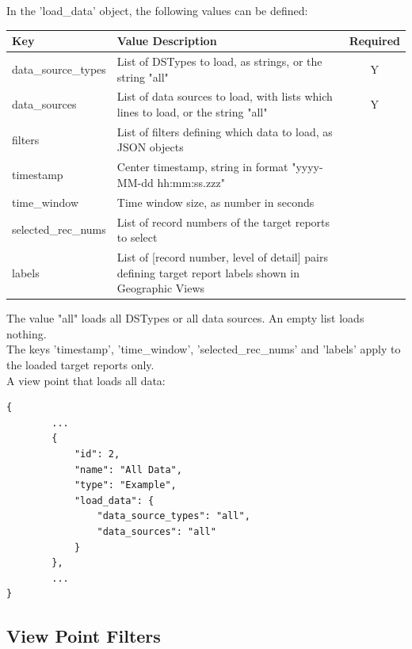 In the 'load\_data' object, the following values can be defined:

\begin{center}
 \begin{table}[H]
  \begin{tabularx}{\textwidth}{ | l | X | c | }
    \hline
    \textbf{Key} & \textbf{Value Description} & \textbf{Required} \\ \hline
    data\_source\_types & List of DSTypes to load, as strings, or the string "all" & Y \\ \hline
    data\_sources & List of data sources to load, with lists which lines to load, or the string "all" & Y \\ \hline
    filters & List of filters defining which data to load, as JSON objects &   \\ \hline
    timestamp & Center timestamp, string in format "yyyy-MM-dd hh:mm:ss.zzz" &    \\ \hline
    time\_window & Time window size, as number in seconds &    \\ \hline
    selected\_rec\_nums & List of record numbers of the target reports to select &    \\ \hline
    labels & List of [record number, level of detail] pairs defining target report labels shown in Geographic Views &    \\ \hline
\end{tabularx}
\end{table}
\end{center}

The value "all" loads all DSTypes or all data sources. An empty list loads nothing. \\

The keys 'timestamp', 'time\_window', 'selected\_rec\_nums' and 'labels' apply to the loaded target reports only. \\

A view point that loads all data:

\begin{lstlisting}[basicstyle=\small\ttfamily]
{
        ...
        {
            "id": 2,
            "name": "All Data",
            "type": "Example",
            "load_data": {
                "data_source_types": "all",
                "data_sources": "all"
            }
        },
        ...
}
\end{lstlisting}

\subsection{View Point Filters}

